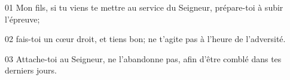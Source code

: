 01 Mon fils, si tu viens te mettre au service du Seigneur, prépare-toi à subir l’épreuve;

02 fais-toi un cœur droit, et tiens bon; ne t’agite pas à l’heure de l’adversité.

03 Attache-toi au Seigneur, ne l’abandonne pas, afin d’être comblé dans tes derniers jours.
